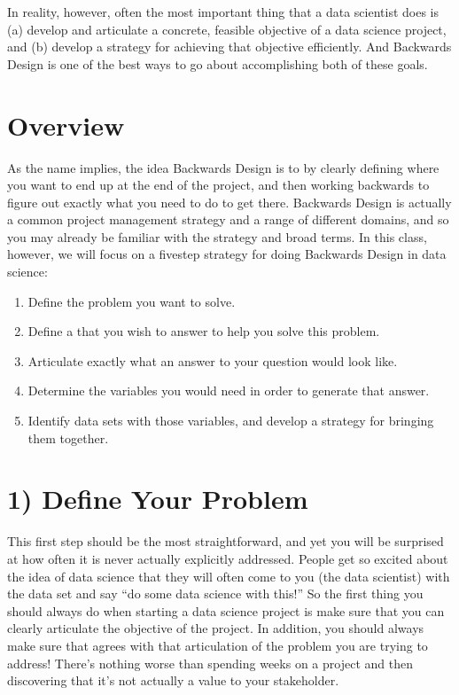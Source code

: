 \documentclass[letterpaper,10pt,english]{jupyterBook}
\begin{document}
\sphinxAtStartPar
In reality, however, often the most important thing that a data scientist does is (a) develop and articulate a concrete, feasible objective of a data science project, and (b) develop a strategy for achieving that objective efficiently. And Backwards Design is one of the best ways to go about accomplishing both of these goals.


\section{Overview}
\label{\detokenize{40_in_practice/05_backwards_design:overview}}
\sphinxAtStartPar
As the name implies, the idea Backwards Design is to  by clearly defining where you want to end up at the end of the project, and then working backwards to figure out exactly what you need to do to get there. Backwards Design is actually a common project management strategy and a range of different domains, and so you may already be familiar with the strategy and broad terms. In this class, however, we will focus on a five\sphinxhyphen{}step strategy for doing Backwards Design in data science:
\begin{enumerate}
%
\item {} 
\sphinxAtStartPar
Define the problem you want to solve.

\item {} 
\sphinxAtStartPar
Define a  that you wish to answer to help you solve this problem.

\item {} 
\sphinxAtStartPar
Articulate exactly what an answer to your question would look like.

\item {} 
\sphinxAtStartPar
Determine the variables you would need in order to generate that answer.

\item {} 
\sphinxAtStartPar
Identify data sets with those variables, and develop a strategy for bringing them together.

\end{enumerate}


\section{1) Define Your Problem}
\label{\detokenize{40_in_practice/05_backwards_design:define-your-problem}}
\sphinxAtStartPar
This first step should be the most straightforward, and yet you will be surprised at how often it is never actually explicitly addressed. People get so excited about the idea of data science that they will often come to you (the data scientist) with the data set and say “do some data science with this!” So the first thing you should always do when starting a data science project is make sure that you can clearly articulate the objective of the project. In addition, you should always make sure that  agrees with that articulation of the problem you are trying to address! There’s nothing worse than spending weeks on a project and then discovering that it’s not actually a value to your stakeholder.
\end{document}
